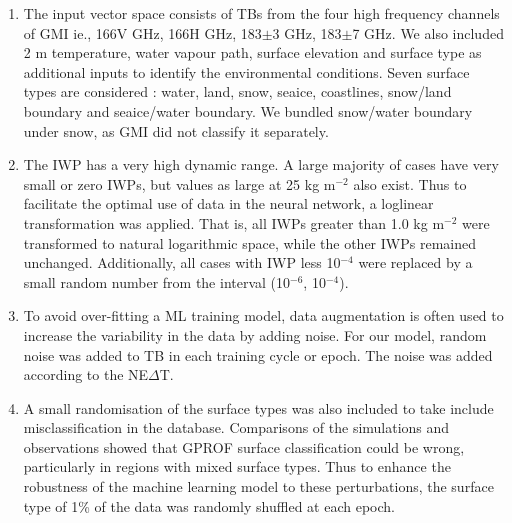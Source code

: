 \documentclass[amt, manuscript]{copernicus}
\begin{document}
\begin{enumerate}
	
	\item The input vector space consists of TBs from the four high frequency channels of GMI ie., 166V\,\,GHz, 166H\,\,GHz, 183$\pm$3\,\,GHz, 183$\pm$7\,\,GHz. We also included 2\,\,m temperature, water vapour path, surface elevation and surface type as additional inputs to identify the environmental conditions. Seven surface types are considered : water, land, snow, seaice, coastlines, snow/land boundary and seaice/water boundary. We bundled snow/water boundary under snow, as GMI did not classify it separately. 
	
	\item The IWP has a very high dynamic range. A large majority of cases have very small or zero IWPs, but values as large at 25\,\,kg m$^{-2}$ also exist. Thus to facilitate the optimal use of data in the neural network, a loglinear transformation was applied. That is, all IWPs greater than 1.0\,\,kg m$^{-2}$  were transformed to natural logarithmic space, while the other IWPs remained unchanged. Additionally, all cases with IWP less 10$^{-4}$ were replaced by a small random number from the interval (10$^{-6}$, 10$^{-4}$).	
	
	\item To avoid over-fitting a ML training model, data augmentation is often used to increase the variability in the data by adding noise. For our model, random noise was added to TB in each training cycle or epoch. The noise was added according to the NE$\Delta$T. 
	
	\item A small randomisation of the surface types was also included to take include misclassification in the database. Comparisons of the simulations and observations showed that GPROF surface classification could be wrong, particularly in regions with mixed surface types. Thus to enhance the robustness of the machine learning model to these perturbations, the surface type of 1\% of the data was randomly shuffled at each epoch. 	
	
\end{enumerate}


\noappendix       %

\end{document}
